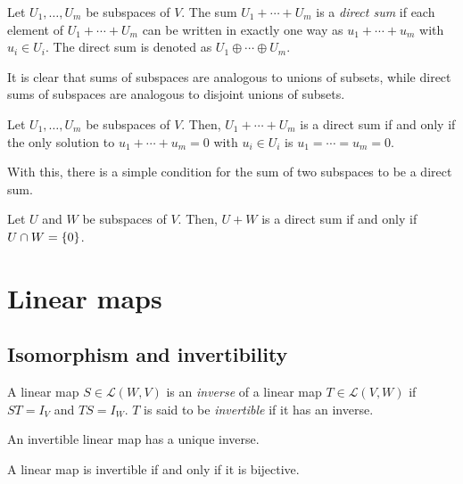 \documentclass{article}
\begin{document}
\begin{definition}
  Let $U_1, \ldots, U_m$ be subspaces of $V$.
  The sum $U_1 + \cdots + U_m$ is a \emph{direct sum} if each element of $U_1 + \cdots + U_m$ can be written in exactly one way as $u_1 + \cdots + u_m$ with $u_i \in U_i$.
  The direct sum is denoted as $U_1 \oplus \cdots \oplus U_m$.
\end{definition}
It is clear that sums of subspaces are analogous to unions of subsets, while direct sums of subspaces are analogous to disjoint unions of subsets.

\begin{theorem}
  Let $U_1, \ldots, U_m$ be subspaces of $V$.
  Then, $U_1 + \cdots + U_m$ is a direct sum if and only if the only solution to $u_1 + \cdots + u_m = 0$ with $u_i \in U_i$ is $u_1 = \cdots = u_m = 0$.
\end{theorem}
With this, there is a simple condition for the sum of two subspaces to be a direct sum.

\begin{theorem}
  Let $U$ and $W$ be subspaces of $V$.
  Then, $U + W$ is a direct sum if and only if $U \cap W = \{0\}$.
\end{theorem}

\section{Linear maps}

\subsection{Isomorphism and invertibility}

\begin{theorem}
  A linear map $S \in \mathcal{L}(W, V)$ is an \emph{inverse} of a linear map $T \in \mathcal{L}(V, W)$ if $ST = I_V$ and $TS = I_W$.
  $T$ is said to be \emph{invertible} if it has an inverse.
\end{theorem}

\begin{remark}
  An invertible linear map has a unique inverse.
\end{remark}

\begin{theorem}
  A linear map is invertible if and only if it is bijective.
\end{theorem}
\end{document}

